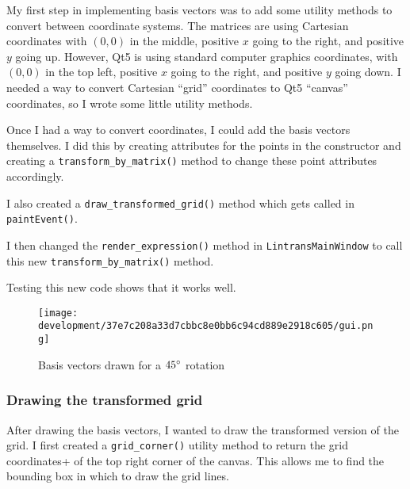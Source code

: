 \documentclass[../main.tex]{subfiles}
\begin{document}
My first step in implementing basis vectors was to add some utility methods to convert between coordinate systems. The matrices are using Cartesian coordinates with $(0, 0)$ in the middle, positive $x$ going to the right, and positive $y$ going up. However, Qt5 is using standard computer graphics coordinates, with $(0, 0)$ in the top left, positive $x$ going to the right, and positive $y$ going down. I needed a way to convert Cartesian \enquote{grid} coordinates to Qt5 \enquote{canvas} coordinates, so I wrote some little utility methods.


Once I had a way to convert coordinates, I could add the basis vectors themselves. I did this by creating attributes for the points in the constructor and creating a \texttt{transform\_by\_matrix()} method to change these point attributes accordingly.


I also created a \texttt{draw\_transformed\_grid()} method which gets called in \texttt{paintEvent()}.


I then changed the \texttt{render\_expression()} method in \texttt{LintransMainWindow} to call this new \texttt{transform\_by\_matrix()} method.


Testing this new code shows that it works well.

\begin{figure}[H]
	\centering
	\texttt{[image: development/37e7c208a33d7cbbc8e0bb6c94cd889e2918c605/gui.png]}
	\caption{Basis vectors drawn for a $45\degree$ rotation}
	\label{fig:development:37e7c208a33d7cbbc8e0bb6c94cd889e2918c605:gui.png}
\end{figure}

\subsubsection{Drawing the transformed grid\label{development:visualizing-matrices:drawing-the-transformed-grid}}

After drawing the basis vectors, I wanted to draw the transformed version of the grid. I first created a \texttt{grid\_corner()} utility method to return the grid coordinates+ of the top right corner of the canvas. This allows me to find the bounding box in which to draw the grid lines.
\end{document}
